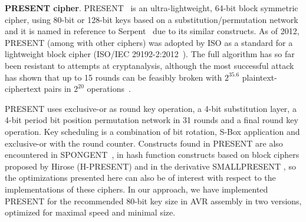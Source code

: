 \documentclass[11pt]{article}
\begin{document}
\textbf{PRESENT cipher}. PRESENT~\cite{bogdanov2007present} is an ultra-lightweight, 64-bit block symmetric cipher, using 80-bit or 128-bit keys based on a substitution/permutation network and it is named in reference to Serpent~\cite{anderson1998serpent} due to its similar constructs.
As of 2012, PRESENT (among with other ciphers) was adopted by ISO as a standard for a lightweight block cipher (ISO/IEC 29192-2:2012~\cite{present_iso}). The full algorithm has so far been resistant to attempts at cryptanalysis, although the most successful attack has shown that up to 15 rounds can be feasibly broken with $2^{35.6}$ plaintext-ciphertext pairs in $2^{20}$ operations~\cite{abed2012biclique,collard2009statistical,nakahara2009linear}.

PRESENT uses exclusive-or as round key operation, a 4-bit substitution layer, a 4-bit period bit position permutation network in 31 rounds and a final round key operation.
Key scheduling is a combination of bit rotation, S-Box application and exclusive-or with the round counter.
Constructs found in PRESENT are also encountered in SPONGENT~\cite{bogdanov2011spongent}, in hash function constructs based on block ciphers proposed by Hirose \cite{bogdanov2008hash,hirose2005provably,hirose2006some} (H-PRESENT) and in the derivative SMALLPRESENT \cite{leander2010small}, so the optimizations presented here can also be of interest with respect to the implementations of these ciphers. In our approach, we have implemented PRESENT for the recommended 80-bit key size in AVR assembly in two versions, optimized for maximal speed and minimal size.\\

\end{document}
